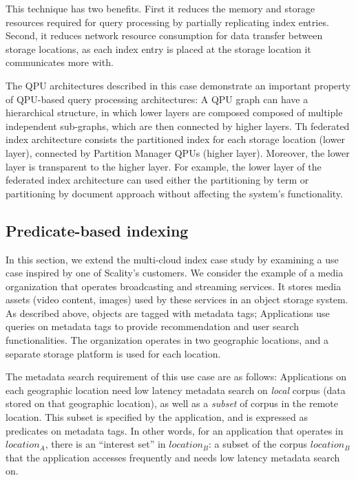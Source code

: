 This technique has two benefits.
First it reduces the memory and storage resources required for query processing by partially replicating index entries.
Second, it reduces network resource consumption for data transfer between storage locations,
as each index entry is placed at the storage location it communicates more with.

The QPU architectures described in this case demonstrate an important property of QPU-based query processing architectures:
A QPU graph can have a hierarchical structure,
in which lower layers are composed composed of multiple independent sub-graphs,
which are then connected by higher layers.
Th federated index architecture consists the partitioned index for each storage location (lower layer),
connected by Partition Manager QPUs (higher layer).
Moreover, the lower layer is transparent to the higher layer.
For example, the lower layer of the federated index architecture can used either the partitioning by term or
partitioning by document approach without affecting the system's functionality.

\subsection{Predicate-based indexing}

In this section, we extend the multi-cloud index case study by examining a use case inspired by one of Scality's customers.
We consider the example of a media organization that operates broadcasting and streaming services.
It stores media assets (video content, images) used by these services in an object storage system.
As described above, objects are tagged with metadata tags;
Applications use queries on metadata tags to provide recommendation and user search functionalities.
The organization operates in two geographic locations, and a separate storage platform is used for each location.

The metadata search requirement of this use case are as follows:
Applications on each geographic location need low latency metadata search on \textit{local} corpus (data stored on that geographic location),
as well as a \textit{subset} of corpus in the remote location.
This subset is specified by the application, and is expressed as predicates on metadata tags.
In other words, for an application that operates in $location_A$, there is an ``interest set'' in $location_B$:
a subset of the corpus $location_B$ that the application accesses frequently and needs low latency metadata search on.

